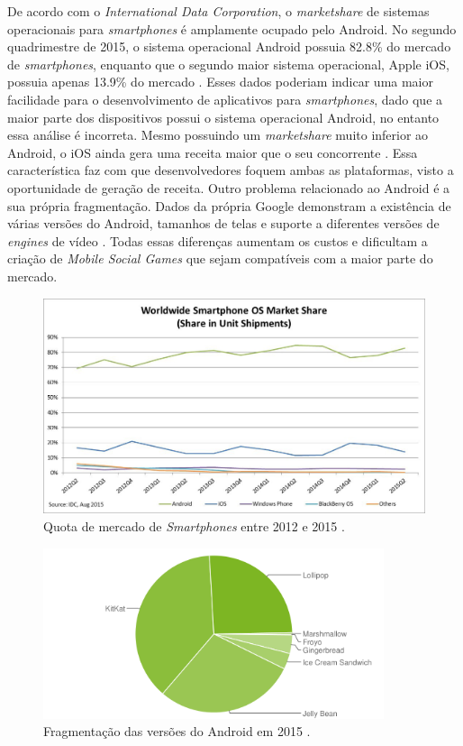 De acordo com o \textit{International Data Corporation}, o \textit{marketshare} de sistemas operacionais para \textit{smartphones} é amplamente ocupado pelo Android. No segundo quadrimestre de 2015, o sistema operacional Android possuia 82.8\% do mercado de \textit{smartphones}, enquanto que o segundo maior sistema operacional, Apple iOS, possuia apenas 13.9\% do mercado \cite{idc}. Esses dados poderiam indicar uma maior facilidade para o desenvolvimento de aplicativos para \textit{smartphones}, dado que a maior parte dos dispositivos possui o sistema operacional Android, no entanto essa análise é incorreta. Mesmo possuindo um \textit{marketshare} muito inferior ao Android, o iOS ainda gera uma receita maior que o seu concorrente \cite{appAnnie}. Essa característica faz com que desenvolvedores foquem ambas as plataformas, visto a oportunidade de geração de receita. Outro problema relacionado ao Android é a sua própria fragmentação. Dados da própria Google demonstram a existência de várias versões do Android, tamanhos de telas e suporte a diferentes versões de \textit{engines} de vídeo \cite{dashboardGoogle}. Todas essas diferenças aumentam os custos e dificultam a criação de \textit{Mobile Social Games} que sejam compatíveis com a maior parte do mercado.

\begin{figure}[h]
  \centering
  \includegraphics[width=12cm]{figuras/market_share}
  \caption{Quota de mercado de \textit{Smartphones} entre 2012 e 2015 \cite{idc}.}
  \label{figura:market_share}
\end{figure}

\begin{figure}[h]
  \centering
  \includegraphics[width=10cm]{figuras/android_chart}
  \caption{Fragmentação das versões do Android em 2015 \cite{dashboardGoogle}.}
  \label{figura:android_chart}
\end{figure}


